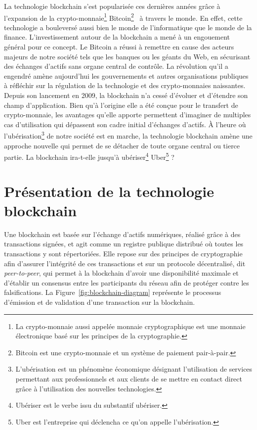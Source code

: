 \documentclass{tnreport}
\begin{document}
La technologie blockchain s'est popularisée ces dernières années grâce à l'expansion de la crypto-monnaie\footnote{La crypto-monnaie aussi appelée monnaie cryptographique est une monnaie électronique basé sur les principes de la cryptographie.} Bitcoin\footnote{Bitcoin est une crypto-monnaie et un système de paiement pair-à-pair.}~\cite{Bitcoin} à travers le monde. 
En effet, cette technologie a bouleversé aussi bien le monde de l'informatique que le monde de la finance. 
L'investissement autour de la blockchain a mené à un engouement général pour ce concept. 
Le Bitcoin a réussi à remettre en cause des acteurs majeurs de notre société tels que les banques ou les géants du Web, en sécurisant des échanges d'actifs sans organe central de contrôle. 
La révolution qu'il a engendré amène aujourd'hui les gouvernements et autres organisations publiques à réfléchir sur la régulation de la technologie et des crypto-monnaies naissantes.
Depuis son lancement en 2009, la blockchain n'a cessé d'évoluer et d'étendre son champ d'application.
Bien qu'à l'origine elle a été conçue pour le transfert de crypto-monnaie, les avantages qu'elle apporte permettent d'imaginer de multiples cas d'utilisation qui dépassent son cadre initial d'échanges d'actifs.
À l'heure où l'ubérisation\footnote{L'ubérisation est un phénomène économique désignant l'utilisation de services permettant aux professionnels et aux clients de se mettre en contact direct grâce à l'utilisation des nouvelles technologies.} de notre société est en marche, la technologie blockchain amène une approche nouvelle qui permet de se détacher de toute organe central ou tierce partie. 
La blockchain ira-t-elle jusqu'à ubériser\footnote{Ubériser est le verbe issu du substantif ubériser.} Uber\footnote{Uber est l'entreprise qui déclencha ce qu'on appelle l'ubérisation.} ?

\section{Présentation de la technologie blockchain}

Une blockchain est basée sur l'échange d'actifs numériques, réalisé grâce à des transactions signées, et agit comme un registre publique distribué où toutes les transactions y sont répertoriées. Elle repose sur des principes de cryptographie afin d'assurer l'intégrité de ces transactions et sur un protocole décentralisé, dit {\em peer-to-peer}, qui permet à la blockchain d'avoir une disponibilité maximale et d'établir un consensus entre les participants du réseau afin de protéger contre les falsifications. La Figure~\ref{fig:blockchain-diagram} représente le processus d'émission et de validation d'une transaction sur la blockchain.
\end{document}
